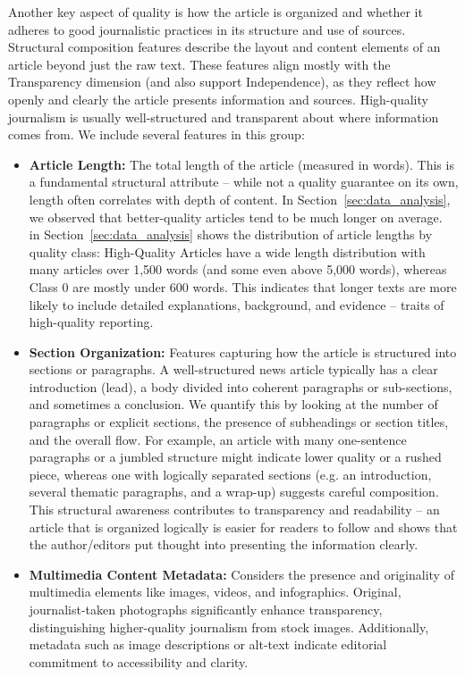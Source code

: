 Another key aspect of quality is how the article is organized and whether it adheres to good journalistic practices in its structure and use of sources. Structural composition features describe the layout and content elements of an article beyond just the raw text. These features align mostly with the Transparency dimension (and also support Independence), as they reflect how openly and clearly the article presents information and sources. High-quality journalism is usually well-structured and transparent about where information comes from. We include several features in this group:
\begin{itemize}
  \item \textbf{Article Length:} The total length of the article (measured in words). This is a fundamental structural attribute – while not a quality guarantee on its own, length often correlates with depth of content. In Section~\ref{sec:data_analysis}, we observed that better-quality articles tend to be much longer on average. ~ in Section~\ref{sec:data_analysis} shows the distribution of article lengths by quality class: High-Quality Articles have a wide length distribution with many articles over 1,500 words (and some even above 5,000 words), whereas \ac{Class 0} are mostly under 600 words. This indicates that longer texts are more likely to include detailed explanations, background, and evidence – traits of high-quality reporting.
  \item \textbf{Section Organization:} Features capturing how the article is structured into sections or paragraphs. A well-structured news article typically has a clear introduction (lead), a body divided into coherent paragraphs or sub-sections, and sometimes a conclusion. We quantify this by looking at the number of paragraphs or explicit sections, the presence of subheadings or section titles, and the overall flow. For example, an article with many one-sentence paragraphs or a jumbled structure might indicate lower quality or a rushed piece, whereas one with logically separated sections (e.g. an introduction, several thematic paragraphs, and a wrap-up) suggests careful composition. This structural awareness contributes to transparency and readability – an article that is organized logically is easier for readers to follow and shows that the author/editors put thought into presenting the information clearly.
  \item \textbf{Multimedia Content Metadata:}  Considers the presence and originality of multimedia elements like images, videos, and infographics. Original, journalist-taken photographs significantly enhance transparency, distinguishing higher-quality journalism from stock images. Additionally, metadata such as image descriptions or alt-text indicate editorial commitment to accessibility and clarity.

\end{itemize}
